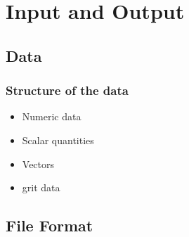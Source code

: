 \documentclass[compress]{beamer}
\begin{document}
\section{Input and Output}
\subsection{Data}

\begin{frame}[fragile]
	\frametitle{Structure of the data}

		\begin{itemize}
		    \item Numeric data
			\item Scalar quantities
			\item Vectors
			\item grit data
		\end{itemize}
	
\end{frame}

\subsection{File Format}
\end{document}
